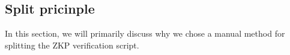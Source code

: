 \subsection{Split pricinple} \label{sec:split-pricinple}

In this section, we will primarily discuss why we chose a manual method for splitting the ZKP verification script.



